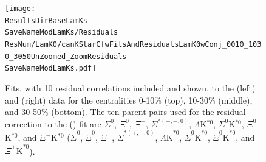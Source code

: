 \documentclass[../AnalysisNoteJBuxton.tex]{subfiles}
\renewcommand{\ResNum}{_10Res}
\renewcommand{\SaveNameModLamKs}{\MomRes\NonFlatBgd\ResNum\PrimMaxDecay\ResMethod\ParamFixAndShareLamKs}
\begin{document}
\begin{landscape}
\begin{figure}[h]
  \centering
  \texttt{[image: \\ResultsDirBaseLamKs\\SaveNameModLamKs/Residuals\\ResNum/LamK0/canKStarCfwFitsAndResidualsLamK0wConj\_0010\_1030\_3050UnZoomed\_ZoomResiduals\\SaveNameModLamKs.pdf]}
  \caption[\LamALamKs Fits showing 10 Residuals]{Fits, with 10 residual correlations included and shown, to the \LamKs (left) and \ALamKs (right) data for the centralities 0-10\% (top), 10-30\% (middle), and 30-50\% (bottom).  The ten parent pairs used for the residual correction to the \LamKs (\ALamKs) fit are $\Sigma^{0}$\Ks, $\Xi^{0}$\Ks, $\Xi^{-}$\Ks, $\Sigma^{*(+,-,0)}$\Ks, $\Lambda$K$^{*0}$, $\Sigma^{0}$K$^{*0}$, $\Xi^{0}$K$^{*0}$, and $\Xi^{-}$K$^{*0}$ ($\bar{\Sigma}^{0}$\Ks, $\bar{\Xi}^{0}$\Ks, $\bar{\Xi}^{+}$\Ks, $\bar{\Sigma}^{*(+,-,0)}$\Ks, $\bar{\Lambda}\bar{\mathrm{K}}^{*0}$, $\bar{\Sigma}^{0}\bar{\mathrm{K}}^{*0}$, $\bar{\Xi}^{0}\bar{\mathrm{K}}^{*0}$, and $\bar{\Xi}^{+}\bar{\mathrm{K}}^{*0}$).}
  \label{fig:LamK0wConjFitsAndResiduals_10Res}
\end{figure}



\end{landscape}
\end{document}
